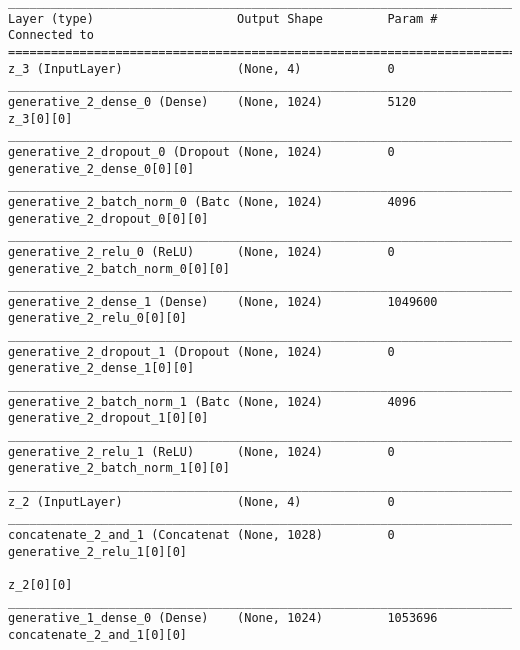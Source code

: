\begin{lstlisting}[caption={dSprites-\ac{VLAE} Decoder},captionpos=b,basicstyle=\tiny, label={lst:dsprites-vlae-decoder}]
__________________________________________________________________________________________________
Layer (type)                    Output Shape         Param #     Connected to
==================================================================================================
z_3 (InputLayer)                (None, 4)            0
__________________________________________________________________________________________________
generative_2_dense_0 (Dense)    (None, 1024)         5120        z_3[0][0]
__________________________________________________________________________________________________
generative_2_dropout_0 (Dropout (None, 1024)         0           generative_2_dense_0[0][0]
__________________________________________________________________________________________________
generative_2_batch_norm_0 (Batc (None, 1024)         4096        generative_2_dropout_0[0][0]
__________________________________________________________________________________________________
generative_2_relu_0 (ReLU)      (None, 1024)         0           generative_2_batch_norm_0[0][0]
__________________________________________________________________________________________________
generative_2_dense_1 (Dense)    (None, 1024)         1049600     generative_2_relu_0[0][0]
__________________________________________________________________________________________________
generative_2_dropout_1 (Dropout (None, 1024)         0           generative_2_dense_1[0][0]
__________________________________________________________________________________________________
generative_2_batch_norm_1 (Batc (None, 1024)         4096        generative_2_dropout_1[0][0]
__________________________________________________________________________________________________
generative_2_relu_1 (ReLU)      (None, 1024)         0           generative_2_batch_norm_1[0][0]
__________________________________________________________________________________________________
z_2 (InputLayer)                (None, 4)            0
__________________________________________________________________________________________________
concatenate_2_and_1 (Concatenat (None, 1028)         0           generative_2_relu_1[0][0]
                                                                 z_2[0][0]
__________________________________________________________________________________________________
generative_1_dense_0 (Dense)    (None, 1024)         1053696     concatenate_2_and_1[0][0]

\end{lstlisting}
